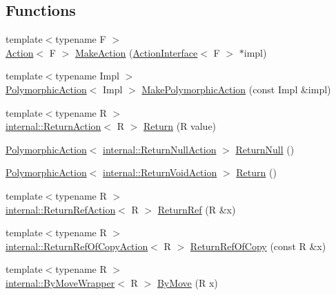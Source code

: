 \subsection*{Functions}
\begin{DoxyCompactItemize}
\item 
{\footnotesize template$<$typename F $>$ }\\\hyperlink{classtesting_1_1Action}{Action}$<$ F $>$ \hyperlink{namespacetesting_ae6b9960db2b2685e043ce5215291f5b8}{Make\+Action} (\hyperlink{classtesting_1_1ActionInterface}{Action\+Interface}$<$ F $>$ $\ast$impl)
\item 
{\footnotesize template$<$typename Impl $>$ }\\\hyperlink{classtesting_1_1PolymorphicAction}{Polymorphic\+Action}$<$ Impl $>$ \hyperlink{namespacetesting_a36bd06c5ea972c6df0bd9f40a7a94c65}{Make\+Polymorphic\+Action} (const Impl \&impl)
\item 
{\footnotesize template$<$typename R $>$ }\\\hyperlink{classtesting_1_1internal_1_1ReturnAction}{internal\+::\+Return\+Action}$<$ R $>$ \hyperlink{namespacetesting_af6d1c13e9376c77671e37545cd84359c}{Return} (R value)
\item 
\hyperlink{classtesting_1_1PolymorphicAction}{Polymorphic\+Action}$<$ \hyperlink{classtesting_1_1internal_1_1ReturnNullAction}{internal\+::\+Return\+Null\+Action} $>$ \hyperlink{namespacetesting_aa0331596e269114da101f810d3a1b88b}{Return\+Null} ()
\item 
\hyperlink{classtesting_1_1PolymorphicAction}{Polymorphic\+Action}$<$ \hyperlink{classtesting_1_1internal_1_1ReturnVoidAction}{internal\+::\+Return\+Void\+Action} $>$ \hyperlink{namespacetesting_a8da8e53d2e7bc4e3c531f7435ad04823}{Return} ()
\item 
{\footnotesize template$<$typename R $>$ }\\\hyperlink{classtesting_1_1internal_1_1ReturnRefAction}{internal\+::\+Return\+Ref\+Action}$<$ R $>$ \hyperlink{namespacetesting_a18eda8fe9c89ee856c199a2e04ca1641}{Return\+Ref} (R \&x)
\item 
{\footnotesize template$<$typename R $>$ }\\\hyperlink{classtesting_1_1internal_1_1ReturnRefOfCopyAction}{internal\+::\+Return\+Ref\+Of\+Copy\+Action}$<$ R $>$ \hyperlink{namespacetesting_ac1b75444c89371dc25ebcfcc48336201}{Return\+Ref\+Of\+Copy} (const R \&x)
\item 
{\footnotesize template$<$typename R $>$ }\\\hyperlink{structtesting_1_1internal_1_1ByMoveWrapper}{internal\+::\+By\+Move\+Wrapper}$<$ R $>$ \hyperlink{namespacetesting_acaa432211a3aec62e3d0f24b47bd2dae}{By\+Move} (R x)

\end{DoxyCompactItemize}
